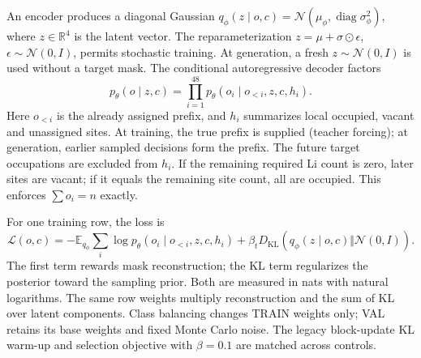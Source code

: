 \documentclass[10pt]{article}
\begin{document}
An encoder produces a diagonal Gaussian
$q_\phi(z\mid o,c)=\mathcal N(\mu_\phi,\operatorname{diag}\sigma_\phi^2)$,
where $z\in\mathbb R^4$ is the latent vector. The reparameterization
$z=\mu+\sigma\odot\epsilon$, $\epsilon\sim\mathcal N(0,I)$, permits stochastic
training. At generation, a fresh $z\sim\mathcal N(0,I)$ is used without a target
mask. The conditional autoregressive decoder factors
\begin{equation}
 p_\theta(o\mid z,c)=\prod_{i=1}^{48}
 p_\theta(o_i\mid o_{<i},z,c,h_i).
\end{equation}
Here $o_{<i}$ is the already assigned prefix, and $h_i$ summarizes local
occupied, vacant and unassigned sites. At training, the true prefix is supplied
(teacher forcing); at generation, earlier sampled decisions form the prefix.
The future target occupations are excluded from $h_i$. If the remaining required
Li count is zero, later sites are vacant; if it equals the remaining site count,
all are occupied. This enforces $\sum o_i=n$ exactly.

For one training row, the loss is
\begin{equation}
 \mathcal L(o,c)=-\mathbb E_{q_\phi}\sum_i\log p_\theta(o_i\mid o_{<i},z,c,h_i)
 +\beta_t D_{\mathrm{KL}}\!\left(q_\phi(z\mid o,c)\Vert\mathcal N(0,I)\right).
\end{equation}
The first term rewards mask reconstruction; the KL term regularizes the
posterior toward the sampling prior. Both are measured in nats with natural
logarithms. The same row weights multiply reconstruction and the sum of KL over
latent components. Class balancing changes TRAIN weights only; VAL retains its
base weights and fixed Monte Carlo noise. The legacy block-update KL warm-up
and selection objective with $\beta=0.1$ are matched across controls.
\end{document}
